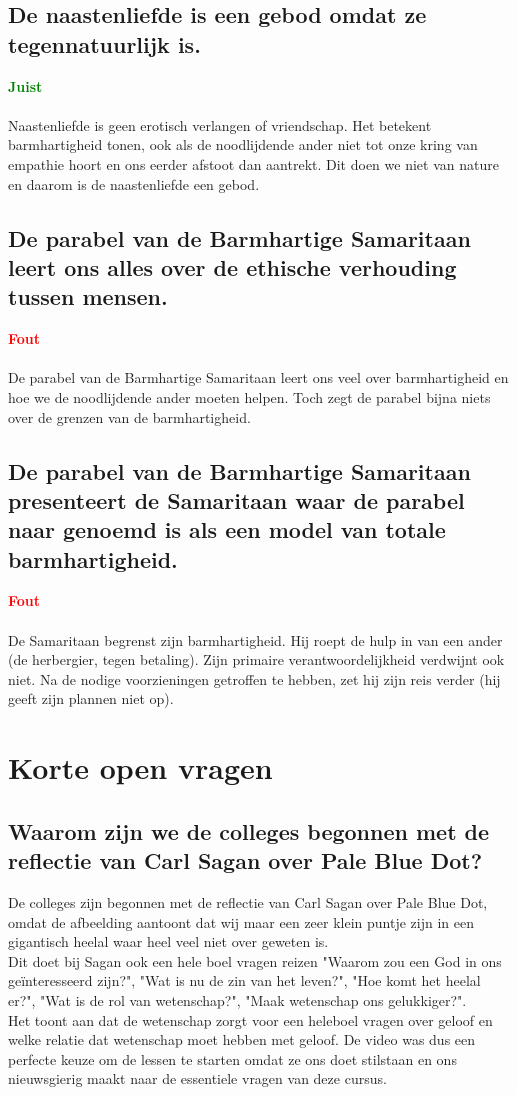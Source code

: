 \documentclass[11pt,a4paper,titlepage]{article}
\begin{document}
\subsection{De naastenliefde is een gebod omdat ze tegennatuurlijk is.}
\textcolor{green}{\textbf{Juist}}\\\\
Naastenliefde is geen erotisch verlangen of vriendschap. Het betekent barmhartigheid tonen, ook als de noodlijdende ander niet tot onze kring van empathie hoort en ons eerder afstoot dan aantrekt. Dit doen we niet van nature en daarom is de naastenliefde een gebod.

\subsection{De parabel van de Barmhartige Samaritaan leert ons alles over de ethische verhouding tussen mensen.}
\textcolor{red}{\textbf{Fout}}\\\\
De parabel van de Barmhartige Samaritaan leert ons veel over barmhartigheid en hoe we de noodlijdende ander moeten helpen. Toch zegt de parabel bijna niets over de grenzen van de barmhartigheid.

\subsection{De parabel van de Barmhartige Samaritaan presenteert de Samaritaan waar de parabel naar genoemd is als een model van totale barmhartigheid.}
\textcolor{red}{\textbf{Fout}}\\\\
De Samaritaan begrenst zijn barmhartigheid. Hij roept de hulp in van een ander (de herbergier, tegen betaling). Zijn primaire verantwoordelijkheid verdwijnt ook niet. Na de nodige voorzieningen getroffen te hebben, zet hij zijn reis verder (hij geeft zijn plannen niet op).

\section{Korte open vragen}

\subsection{Waarom zijn we de colleges begonnen met de reflectie van Carl Sagan over Pale Blue Dot?}
De colleges zijn begonnen met de reflectie van Carl Sagan over Pale Blue Dot, omdat de afbeelding aantoont dat wij maar een zeer klein puntje zijn in een gigantisch heelal waar heel veel niet over geweten is.\\ Dit doet bij Sagan ook een hele boel vragen reizen "Waarom zou een God in ons geïnteresseerd zijn?", "Wat is nu de zin van het leven?", "Hoe komt het heelal er?", "Wat is de rol van wetenschap?", "Maak wetenschap ons gelukkiger?".\\ Het toont aan dat de wetenschap zorgt voor een heleboel vragen over geloof en welke relatie dat wetenschap moet hebben met geloof. De video was dus een perfecte keuze om de lessen te starten omdat ze ons doet stilstaan en ons nieuwsgierig maakt naar de essentiele vragen van deze cursus.
\end{document}
